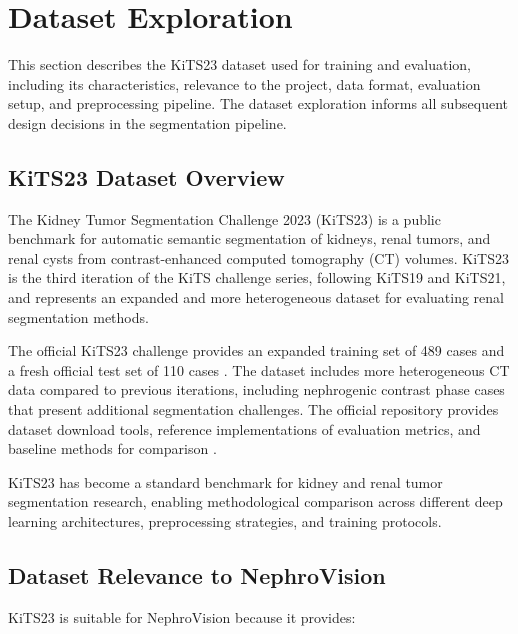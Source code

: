 \section{Dataset Exploration}

This section describes the KiTS23 dataset used for training and evaluation, including its characteristics, relevance to the project, data format, evaluation setup, and preprocessing pipeline. The dataset exploration informs all subsequent design decisions in the segmentation pipeline.

\subsection{KiTS23 Dataset Overview}

The Kidney Tumor Segmentation Challenge 2023 (KiTS23) \cite{kits23} is a public benchmark for automatic semantic segmentation of kidneys, renal tumors, and renal cysts from contrast-enhanced computed tomography (CT) volumes. KiTS23 is the third iteration of the KiTS challenge series, following KiTS19 and KiTS21, and represents an expanded and more heterogeneous dataset for evaluating renal segmentation methods.

The official KiTS23 challenge provides an expanded training set of 489 cases and a fresh official test set of 110 cases \cite{kits23repo}. The dataset includes more heterogeneous CT data compared to previous iterations, including nephrogenic contrast phase cases that present additional segmentation challenges. The official repository provides dataset download tools, reference implementations of evaluation metrics, and baseline methods for comparison \cite{kits23repo}.

KiTS23 has become a standard benchmark for kidney and renal tumor segmentation research, enabling methodological comparison across different deep learning architectures, preprocessing strategies, and training protocols.

\subsection{Dataset Relevance to NephroVision}

KiTS23 is suitable for NephroVision because it provides:


